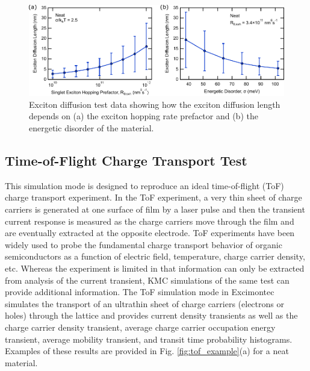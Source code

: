 \documentclass[%
 reprint,onecolumn,notitlepage,
superscriptaddress,longbibliography,
 amsmath,amssymb,
 aps,rmp,floatfix,
]{revtex4-1}
\begin{document}
\begin{figure}[h]
    \centering
    \includegraphics{Exciton_diffusion_example_data.pdf}
    \caption{Exciton diffusion test data showing how the exciton diffusion length depends on (a) the exciton hopping rate prefactor and (b) the energetic disorder of the material.}
    \label{fig:exciton_diffusion_example}
\end{figure}

\subsection{Time-of-Flight Charge Transport Test}

This simulation mode is designed to reproduce an ideal time-of-flight (ToF) charge transport experiment.
In the ToF experiment, a very thin sheet of charge carriers is generated at one surface of film by a laser pulse and then the transient current response is measured as the charge carriers move through the film and are eventually extracted at the opposite electrode.
ToF experiments have been widely used to probe the fundamental charge transport behavior of organic semiconductors as a function of electric field, temperature, charge carrier density, etc.
Whereas the experiment is limited in that information can only be extracted from analysis of the current transient, KMC simulations of the same test can provide additional information.
The ToF simulation mode in Excimontec simulates the transport of an ultrathin sheet of charge carriers (electrons or holes) through the lattice and provides current density transients as well as the charge carrier density transient, average charge carrier occupation energy transient, average mobility transient, and transit time probability histograms.
Examples of these results are provided in Fig. \ref{fig:tof_example}(a) for a neat material.
\end{document}
